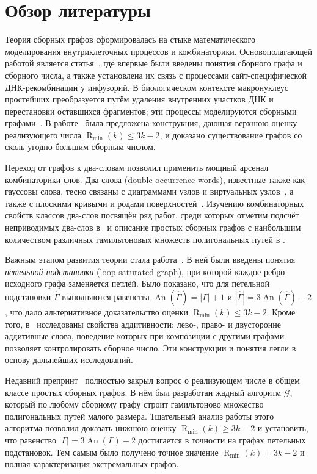 \documentclass{article}
\theoremstyle{definition}
\newcommand{\An}{\operatorname{An}}
\newcommand{\Rmin}{\operatorname{R}_{\min}}
\begin{document}
\section{Обзор литературы}\label{sec:litrev}

Теория сборных графов сформировалась на стыке математического моделирования внутриклеточных процессов и комбинаторики. Основополагающей работой является статья~\cite{Angeleska2009}, где впервые были введены понятия сборного графа и сборного числа, а также установлена их связь с процессами сайт-специфической ДНК-рекомбинации у инфузорий. В биологическом контексте макронуклеус простейших преобразуется путём удаления внутренних участков ДНК и перестановки оставшихся фрагментов; эти процессы моделируются сборными графами~\cite{Ehrenfeucht2005,Brijder2007}. В работе~\cite{Angeleska2009} была предложена конструкция, дающая верхнюю оценку реализующего числа $\Rmin(k)\le 3k-2$, и доказано существование графов со сколь угодно большим сборным числом.

Переход от графов к два-словам позволил применить мощный арсенал комбинаторики слов. Два-слова (double occurrence words), известные также как гауссовы слова, тесно связаны с диаграммами узлов и виртуальных узлов~\cite{Kauffman1999}, а также с плоскими кривыми и родами поверхностей~\cite{Cairns1996}. Изучению комбинаторных свойств классов два-слов посвящён ряд работ, среди которых отметим подсчёт неприводимых два-слов в~\cite{Burns2011} и описание простых сборных графов с наибольшим количеством различных гамильтоновых множеств полигональных путей в \cite{Guterman2026}.

Важным этапом развития теории стала работа~\cite{Muche2012}. В ней были введены понятия \emph{петельной подстановки} (loop‑saturated graph), при которой каждое ребро исходного графа заменяется петлёй. Было показано, что для петельной подстановки $\hat{\Gamma}$ выполняются равенства $\An(\hat{\Gamma})=|\Gamma|+1$ и $|\hat{\Gamma}|=3\An(\hat{\Gamma})-2$, что дало альтернативное доказательство оценки $\Rmin(k)\le 3k-2$. Кроме того, в~\cite{Muche2012} исследованы свойства аддитивности: лево-, право- и двусторонне аддитивные слова, поведение которых при композиции с другими графами позволяет контролировать сборное число. Эти конструкции и понятия легли в основу дальнейших исследований.

Недавний препринт~\cite{MaksaevPreprint} полностью закрыл вопрос о реализующем числе в общем классе простых сборных графов. В нём был разработан жадный алгоритм $\mathcal{G}$, который по любому сборному графу строит гамильтоново множество полигональных путей малого размера. Тщательный анализ работы этого алгоритма позволил доказать нижнюю оценку $\Rmin(k)\ge 3k-2$ и установить, что равенство $|\Gamma|=3\An(\Gamma)-2$ достигается в точности на графах петельных подстановок. Тем самым было получено точное значение $\Rmin(k)=3k-2$ и полная характеризация экстремальных графов. 
\end{document}
